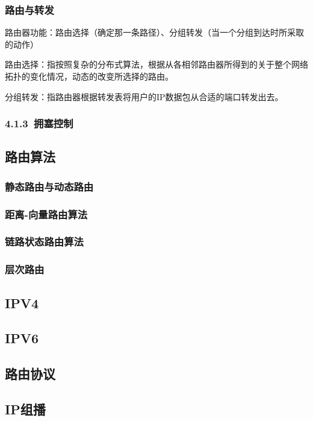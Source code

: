 \documentclass{ctexart}
\begin{document}
\subsubsection{路由与转发}
路由器功能：路由选择（确定那一条路径）、分组转发（当一个分组到达时所采取的动作）

路由选择：指按照复杂的分布式算法，根据从各相邻路由器所得到的关于整个网络拓扑的变化情况，动态的改变所选择的路由。

分组转发：指路由器根据转发表将用户的IP数据包从合适的端口转发出去。

\subsubsection{4.1.3\ 拥塞控制}


\subsection{路由算法}
\subsubsection{静态路由与动态路由}

\subsubsection{距离-向量路由算法}

\subsubsection{链路状态路由算法}

\subsubsection{层次路由}

\subsection{IPV4}
\subsection{IPV6}
\subsection{路由协议}
\subsection{IP组播}
\end{document}
